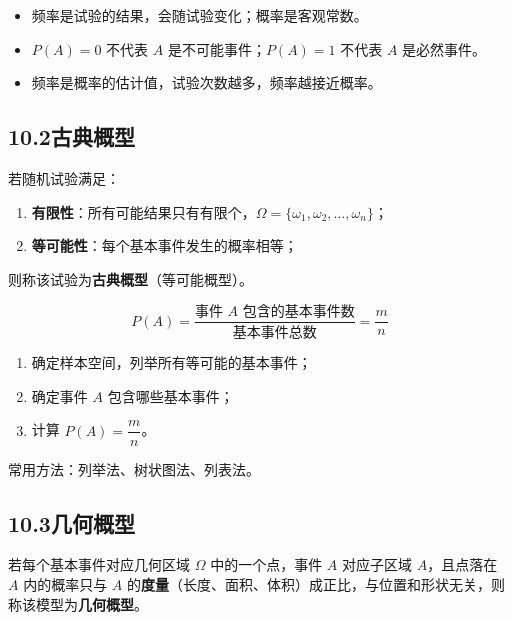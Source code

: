 \documentclass[12pt, a4paper]{ctexart}
\begin{document}
\begin{warnbox}[易错提醒]
\begin{itemize}
  \item 频率是试验的结果，会随试验变化；概率是客观常数。
  \item $P(A) = 0$ 不代表 $A$ 是不可能事件；$P(A) = 1$ 不代表 $A$ 是必然事件。
  \item 频率是概率的估计值，试验次数越多，频率越接近概率。
\end{itemize}
\end{warnbox}

\subsection*{10.2\quad 古典概型}

\begin{knowledgebox}[古典概型的定义]
若随机试验满足：
\begin{enumerate}[label=(\arabic*)]
  \item \textbf{有限性}：所有可能结果只有有限个，$\Omega = \{\omega_1, \omega_2, \ldots, \omega_n\}$；
  \item \textbf{等可能性}：每个基本事件发生的概率相等；
\end{enumerate}
则称该试验为\textbf{古典概型}（等可能概型）。
\end{knowledgebox}

\begin{knowledgebox}[古典概型概率公式]
\[
P(A) = \frac{\text{事件 } A \text{ 包含的基本事件数}}{\text{基本事件总数}} = \frac{m}{n}
\]
\end{knowledgebox}

\begin{tipbox}[求古典概型概率的步骤]
\begin{enumerate}[label=(\arabic*)]
  \item 确定样本空间，列举所有等可能的基本事件；
  \item 确定事件 $A$ 包含哪些基本事件；
  \item 计算 $P(A) = \dfrac{m}{n}$。
\end{enumerate}
常用方法：列举法、树状图法、列表法。
\end{tipbox}

\subsection*{10.3\quad 几何概型}

\begin{knowledgebox}[几何概型的定义]
若每个基本事件对应几何区域 $\Omega$ 中的一个点，事件 $A$ 对应子区域 $A$，且点落在 $A$ 内的概率只与 $A$ 的\textbf{度量}（长度、面积、体积）成正比，与位置和形状无关，则称该模型为\textbf{几何概型}。
\end{knowledgebox}
\end{document}
